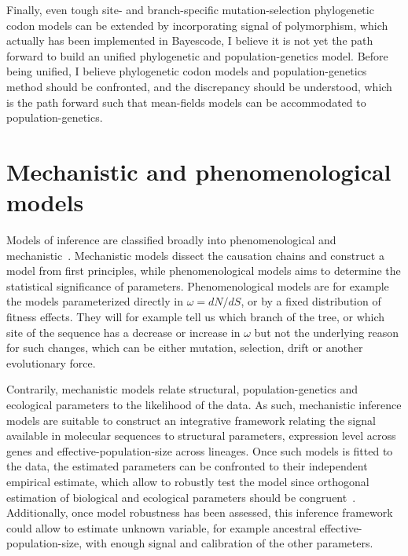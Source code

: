 Finally, even tough site- and branch-specific mutation-selection phylogenetic \gls{codon} models can be extended by incorporating signal of polymorphism, which actually has been implemented in Bayescode, I believe it is not yet the path forward to build an unified phylogenetic and population-genetics model.
Before being unified, I believe phylogenetic codon models and population-genetics method should be confronted, and the discrepancy should be understood, which is the path forward such that mean-fields models can be accommodated to population-genetics.

\section{Mechanistic and phenomenological models}
\label{sec:mechanistic-and-phenomenological-models}

Models of inference are classified broadly into phenomenological and mechanistic~\citep{Rodrigue2010a}.
Mechanistic models dissect the causation chains and construct a model from first principles, while phenomenological models aims to determine the statistical significance of parameters.
Phenomenological models are for example the models parameterized directly in $\omega = dN/dS$, or by a fixed distribution of fitness effects.
They will for example tell us which branch of the tree, or which site of the sequence has a decrease or increase in $\omega$ but not the underlying reason for such changes, which can be either mutation, selection, drift or another evolutionary force.

Contrarily, mechanistic models relate structural, population-genetics and ecological parameters to the \gls{likelihood} of the data.
As such, mechanistic inference models are suitable to construct an integrative framework relating the signal available in molecular sequences to structural parameters, expression level across genes and \gls{effective-population-size} across lineages.
Once such models is fitted to the data, the estimated parameters can be confronted to their independent empirical estimate, which allow to robustly test the model since orthogonal estimation of biological and ecological parameters should be congruent~\citep{Dasmeh2014}.
Additionally, once model robustness has been assessed, this inference framework could allow to estimate unknown variable, for example ancestral \gls{effective-population-size}, with enough signal and calibration of the other parameters. 


